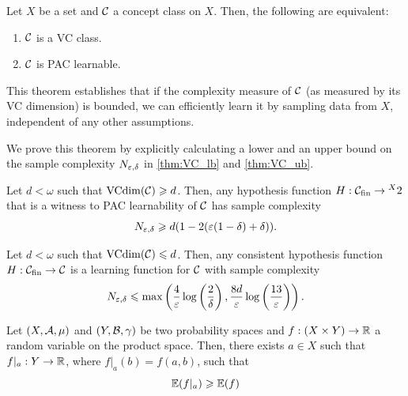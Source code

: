 \begin{theorem}
    \label{thm:fundamentalThmPacLearning}
    Let $X$ be a set and $\mathcal{C}$ a concept class on $X$. Then, the following are equivalent:
    \begin{enumerate}
        \item $\mathcal{C}$ is a VC class.
        \item $\mathcal{C}$ is PAC learnable.
    \end{enumerate}
\end{theorem}

This theorem establishes that if the complexity measure of $\mathcal{C}$ (as measured by its VC dimension) is bounded, we can efficiently learn it by sampling data from $X$, independent of any other assumptions.

We prove this theorem by explicitly calculating a lower and an upper bound on the sample complexity $N_{\varepsilon,\delta}$ in \cref{thm:VC_lb} and \cref{thm:VC_ub}. 

\begin{theorem}
    \label{thm:VC_lb}
    Let $d < \omega$ such that $\operatorname{VCdim}(\mathcal{C}) \geqslant d$. Then, any hypothesis function $H:\mathcal{C}_{\text{fin}}\rightarrow\prescript{X}{}{2}$ that is a witness to PAC learnability of $\mathcal{C}$ has sample complexity
    $$N_{\varepsilon,\delta} \geqslant
    d(1-2(\varepsilon(1-\delta)+\delta)).$$
\end{theorem}

\begin{theorem}
    \label{thm:VC_ub}
    Let $d < \omega$ such that $\operatorname{VCdim}(\mathcal{C}) \leqslant d$. Then, any consistent hypothesis function $H:\mathcal{C}_{\text{fin}}\rightarrow\mathcal{C}$ is a learning function for $\mathcal{C}$ with sample complexity
    $$N_{\varepsilon,\delta} \leqslant \max 
    \left(
    \frac{4}{\varepsilon} \log \left( \frac{2}{\delta} \right), 
    \frac{8d}{\varepsilon} \log \left( \frac{13}{\varepsilon} \right)
    \right).$$
\end{theorem}

\begin{fact}
    \label{fact:expValue}
    Let $(X,\mathcal{A}, \mu)$ and $(Y, \mathcal{B}, \gamma)$ be two probability spaces and $f:(X\times Y)\rightarrow \mathbb{R}$ a random variable on the product space. Then, there exists $a\in X$ such that $f|_a:Y\rightarrow \mathbb{R}$, where $f|_a(b)=f(a,b)$, such that 
    $$\operatorname{\mathbb{E}}(f|_a)\geqslant \operatorname{\mathbb{E}}(f)$$
\end{fact}

